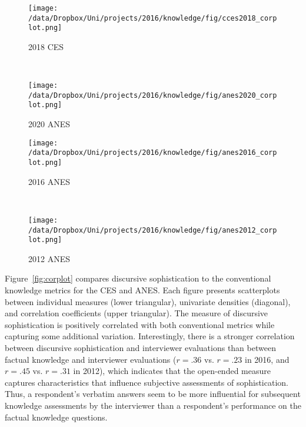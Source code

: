 \begin{figure*}[ht]
    \centering
    \begin{subfigure}[t]{0.45\textwidth}
    	\centering
    	\texttt{[image: /data/Dropbox/Uni/projects/2016/knowledge/fig/cces2018\_corplot.png]}
    	\caption{2018 CES}
    \end{subfigure}
	~~
    \begin{subfigure}[t]{0.45\textwidth}
    	\centering
    	\texttt{[image: /data/Dropbox/Uni/projects/2016/knowledge/fig/anes2020\_corplot.png]}
    	\caption{2020 ANES}
    \end{subfigure}
    \begin{subfigure}[t]{0.45\textwidth}
    	\centering
    	\texttt{[image: /data/Dropbox/Uni/projects/2016/knowledge/fig/anes2016\_corplot.png]}
    	\caption{2016 ANES}
    \end{subfigure}
	~~
    \begin{subfigure}[t]{0.45\textwidth}
        \centering
        \texttt{[image: /data/Dropbox/Uni/projects/2016/knowledge/fig/anes2012\_corplot.png]}
        \caption{2012 ANES}
    \end{subfigure}%
    \caption[Correlation matrix of discursive sophistication and conventional political knowledge metrics]{Correlation matrix of discursive sophistication and conventional political knowledge metrics. The plots on the diagonal display univariate densities for each variable. The panels in the lower triangular display the scatter plot of two measures as well as a linear fit. The upper triangular displays the correlation coefficient. All correlations reported are statistically significant with $p<.05$.}\label{fig:corplot}
\end{figure*}

Figure~\ref{fig:corplot} compares discursive sophistication to the conventional knowledge metrics for the CES and ANES. Each figure presents scatterplots between individual measures (lower triangular), univariate densities (diagonal), and correlation coefficients (upper triangular). The measure of discursive sophistication is positively correlated with both conventional metrics while capturing some additional variation. Interestingly, there is a stronger correlation between discursive sophistication and interviewer evaluations than between factual knowledge and interviewer evaluations ($r=.36$ vs. $r=.23$ in 2016, and $r=.45$ vs. $r=.31$ in 2012), which indicates that the open-ended measure captures characteristics that influence subjective assessments of sophistication. Thus, a respondent's verbatim answers seem to be more influential for subsequent knowledge assessments by the interviewer than a respondent's performance on the factual knowledge questions.

